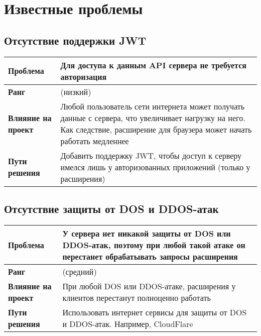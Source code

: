 \chapter{Известные проблемы}
	\label{chapter6}

	\section{Отсутствие поддержки JWT}
		\begin{tabularx}{\textwidth}{
				| >{\centering\arraybackslash\hsize=4cm}X
				| >{\centering\arraybackslash}X
				|}
			\hline
			\textbf{Проблема} &  Для доступа к данным API сервера не требуется авторизация \\\hline
			\textbf{Ранг} &  3 (низкий) \\\hline
			\textbf{Влияние на проект} &  Любой пользователь сети интернета может получать данные с сервера, что увеличивает нагрузку на него. Как следствие, расширение для браузера может начать работать медленнее \\\hline
			\textbf{Пути решения} &  Добавить поддержку JWT, чтобы доступ к серверу имелся лишь у авторизованных приложений (только у расширения) \\\hline
		\end{tabularx}
	\section{Отсутствие защиты от DOS и DDOS-атак}
		\begin{tabularx}{\textwidth}{
				| >{\centering\arraybackslash\hsize=4cm}X
				| >{\centering\arraybackslash}X
				|}
			\hline
			\textbf{Проблема} &  У сервера нет никакой защиты от DOS или DDOS-атак, поэтому при любой такой атаке он перестанет обрабатывать запросы расширения \\\hline
			\textbf{Ранг} &  5 (средний) \\\hline
			\textbf{Влияние на проект} &  При любой DOS или DDOS-атаке, расширения у клиентов перестанут полноценно работать \\\hline
			\textbf{Пути решения} &  Использовать интернет сервисы для защиты от DOS и DDOS-атак. Например, CloudFlare \\\hline
		\end{tabularx}

